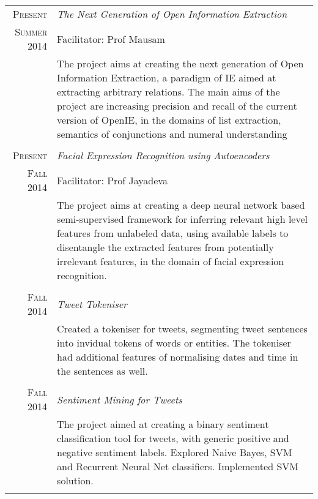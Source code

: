 \documentclass[a4paper,10pt]{article} %
\begin{document}
\begin{tabular}{r|p{11cm}}

\textsc{Present} & \emph{The Next Generation of Open Information Extraction}\\ 
\textsc{Summer 2014} & Facilitator: Prof Mausam \\ &\footnotesize{The project aims at creating the next generation of Open Information Extraction, a paradigm of IE aimed at extracting arbitrary relations. The main aims of the project are increasing precision and recall of the current version of OpenIE, in  the domains of list extraction, semantics of conjunctions and numeral understanding }\\
\multicolumn{2}{c}{} \\


\textsc{Present} & \emph{Facial Expression Recognition using Autoencoders}\\ 
\textsc{Fall 2014} & Facilitator: Prof Jayadeva \\ & \footnotesize{The project aims at creating a deep neural network based semi-supervised framework for inferring relevant high level features from unlabeled data, using available labels to disentangle the extracted features from potentially irrelevant features, in the domain of facial expression recognition.}\\
\multicolumn{2}{c}{} \\


\textsc{Fall 2014}& \emph{Tweet Tokeniser}\\ 
 & \footnotesize{Created a tokeniser for tweets, segmenting tweet sentences into invidual tokens of words or entities. The tokeniser had additional features of normalising dates and time in the sentences as well.}\\
\multicolumn{2}{c}{} \\


\textsc{Fall 2014}& \emph{Sentiment Mining for Tweets}\\ 
 & \footnotesize{The project aimed at creating a binary sentiment classification tool for tweets, with generic positive and negative sentiment labels. Explored Naive Bayes, SVM and Recurrent Neural Net classifiers. Implemented SVM solution.}\\
\multicolumn{2}{c}{} \\


\end{tabular}
\end{document}
